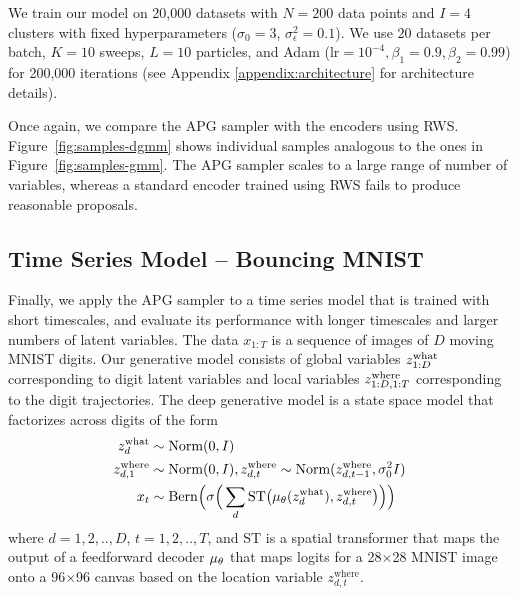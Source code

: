 \documentclass{article}
\theoremstyle{definition}
\begin{document}
We train our model on 20,000 datasets with $N = 200$ data points and $I = 4$ clusters with fixed hyperparameters ($\sigma_0 = 3$, $\sigma^2_{\epsilon} = 0.1$). We use $20$ datasets per batch, $K=10$ sweeps, $L=10$ particles, and Adam ($\mathrm{lr} = 10^{-4}, \beta_1 = 0.9, \beta_2 = 0.99$) for 200,000 iterations (see Appendix \ref{appendix:architecture} for architecture details).

Once again, we compare the APG sampler with the encoders using RWS. Figure~\ref{fig:samples-dgmm} shows individual samples analogous to the ones in Figure~\ref{fig:samples-gmm}. The APG sampler scales to a large range of number of variables, whereas a standard encoder trained using RWS fails to produce reasonable proposals.



\subsection{Time Series Model -- Bouncing MNIST}
Finally, we apply the APG sampler to a time series model that is trained with short timescales, and evaluate its performance with longer timescales and larger numbers of latent variables.
The data $x_{1:T}$ is a sequence of images of $D$ moving MNIST digits.
Our generative model consists of global variables $z_{1:D}^{\mathrm{what}}$ corresponding to digit latent variables and local variables $z_{1:D, 1:T}^{\mathrm{where}}$ corresponding to the digit trajectories.
The deep generative model is a state space model that factorizes across digits of the form
\begin{align*}
    z^{\mathrm{what}}_{d} 
    &\sim 
    \text{Norm}(0, I)
    \\
    z^{\mathrm{where}}_{d, 1} &\sim \text{Norm}(0, I)
    ,
    z^{\mathrm{where}}_{d, t} 
    \sim 
    \text{Norm}(z^{\mathrm{where}}_{d, t - 1}, \sigma^2_0 I) 
    \\
    x_t 
    &\sim
    \mathrm{Bern}
    \Big(
        \sigma
        \Big(
            \sum_{d} \mathrm{ST}
            \big(
                \mu_\theta(z^{\mathrm{what}}_d), 
                z^{\mathrm{where}}_{d, t}
            \big)
        \Big)
    \Big)
\end{align*}
where $d=1, 2,.., D$, $t=1, 2,.., T$, and ST is a spatial transformer \cite{jaderberg2015spatial} that maps the output of a feedforward decoder $\mu_\theta$ that maps logits for a 28$\times$28 MNIST image onto a 96$\times$96 canvas based on the location variable $z^{\mathrm{where}}_{d, t}$. 
\end{document}
